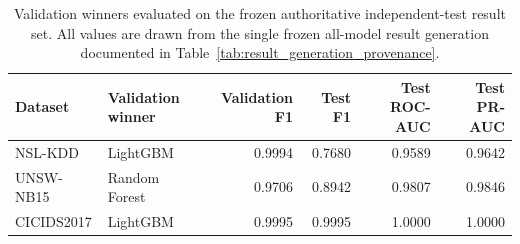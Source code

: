 \begin{table}[!htbp]
\centering
\caption{Validation winners evaluated on the frozen authoritative independent-test result set. All values are drawn from the single frozen all-model result generation documented in Table~\ref{tab:result_generation_provenance}.}
\label{tab:best_model_summary}
\small
\begin{tabular}{llrrrr}
\toprule
Dataset & Validation winner & Validation F1 & Test F1 & Test ROC-AUC & Test PR-AUC \\
\midrule
NSL-KDD & LightGBM & 0.9994 & 0.7680 & 0.9589 & 0.9642 \\
UNSW-NB15 & Random Forest & 0.9706 & 0.8942 & 0.9807 & 0.9846 \\
CICIDS2017 & LightGBM & 0.9995 & 0.9995 & 1.0000 & 1.0000 \\
\bottomrule
\end{tabular}
\end{table}
